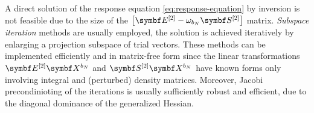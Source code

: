 A direct solution of the response equation \eqref{eq:response-equation} by inversion
is not feasible due to the size of the $\left[\genHessian -
\omega_{b_N}\genMetric \right]$ matrix. \emph{Subspace iteration}
methods are usually employed, the solution is achieved iteratively
by enlarging a projection subspace of trial vectors.\autocite{Saad2003-oa,
Saad2011-gm, Kauczor2011-rd, Malmqvist2013-vw}
These methods can be implemented efficiently and in matrix-free form
since the linear transformations $\genHessian\rspParam{b_N}$ and
$\genMetric\rspParam{b_N}$ have known forms only involving integral and
(perturbed) density matrices.
Moreover, Jacobi precondinioting of the iterations is usually sufficiently
robust and efficient, due to the diagonal dominance of the generalized
Hessian.

